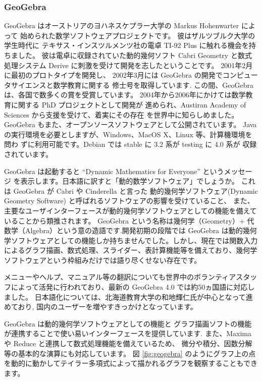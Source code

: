 \documentclass[mingoth,a4paper]{jsarticle}
\begin{document}
\subsubsection{GeoGebra}
GeoGebra はオーストリアのヨハネスケプラー大学の Markus Hohenwarter によって
始められた数学ソフトウェアプロジェクトです。
彼はザルツブルク大学の学生時代に
テキサス・インスツルメンツ社の電卓 TI-92 Plus に触れる機会を持ちました。
彼は電卓に収録されていた動的幾何ソフト Cabri Geometry
と数式処理システム Derive に刺激を受けて開発を志したということです\cite{markus}。
2001年2月に最初のプロトタイプを開発し、
2002年3月には GeoGebra の開発でコンピュータサイエンスと数学教育に関する
修士号を取得しています.
この間、GeoGebra は、各国で数多くの賞を受賞しています。
2004年から2006年にかけては数学教育に関する PhD プロジェクトとして開発が
進められ、Austiran Academy of Sciences から支援を受けて、着実にその存在
を世界中に知らしめました。
GeoGebra もまた、オープンソースソフトウェアとして公開されています。
Java の実行環境を必要としますが、Windows、MacOS X、Linux 等、計算機環境を問わ
ずに利用可能です。Debian では stable に 3.2 系が testing に 4.0 系が
収録されています。

GeoGebra は起動すると ``Dynamic Mathematics for Everyone'' というメッセージ
を表示します。日本語に訳すと「動的数学ソフトウェア」でしょうか。
これは GeoGebra が Cabri や Cinderella と言った
動的幾何学ソフトウェア(Dynamic Geometry Software)
と呼ばれるソフトウェアの影響を受けていること、
また、主要なユーザインターフェースが動的幾何学ソフトウェアとしての機能を備えていることから類推されます。
GeoGebra という名称は幾何学（Geometry）+ 代数学（Algebra）という意の造語です.開発初期の段階では GeoGebra は動的幾何学ソフトウェアとしての機能しか持ちませんでした。しかし、現在では関数入力によるグラフ描画、数式処理、スライダー、表計算機能等を備えており、幾何学ソフトウェアという枠組みだけでは語り尽くせない存在です。

メニューやヘルプ、マニュアル等の翻訳についても世界中のボランティアスタッ
フによって活発に行われており、最新の GeoGebra 4.0 では約50ヵ国語に対応しました。
日本語化については、北海道教育大学の和地輝仁氏が中心となって進めており,
国内のユーザーを増やすきっかけとなっています。

GeoGebra は動的幾何学ソフトウェアとしての機能と
グラフ描画ソフトの機能が連携することで使い易いインターフェースを提供しています.
また、Maxima や Reduce と連携して数式処理機能を備えているため、
微分や積分、因数分解等の基本的な演算にも対応しています。
図 \ref{fig:geogebra} のようにグラフ上の点を動的に動かしてテイラー多項式によって描かれるグラフを観察することもできます。
\end{document}
